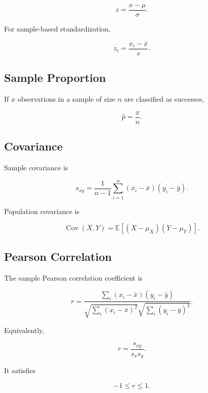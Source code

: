 \[
\boxed{
z
=
\frac{
x-\mu
}{
\sigma
}.
}
\]

For sample-based standardization,

\[
\boxed{
z_i
=
\frac{
x_i-\bar{x}
}{
s
}.
}
\]

\subsection{Sample Proportion}
\label{subsec:sample-proportion-reference}

If \(x\) observations in a sample of size \(n\) are classified as successes,

\[
\boxed{
\hat p
=
\frac{x}{n}.
}
\]

\subsection{Covariance}
\label{subsec:sample-covariance-reference}

Sample covariance is

\[
\boxed{
s_{xy}
=
\frac{
1
}{
n-1
}
\sum_{i=1}^{n}
(x_i-\bar{x})
(y_i-\bar{y}).
}
\]

Population covariance is

\[
\boxed{
\operatorname{Cov}(X,Y)
=
\mathbb{E}
[
(X-\mu_X)(Y-\mu_Y)
].
}
\]

\subsection{Pearson Correlation}
\label{subsec:pearson-correlation-reference}

The sample Pearson correlation coefficient is

\[
\boxed{
r
=
\frac{
\sum_i
(x_i-\bar{x})
(y_i-\bar{y})
}{
\sqrt{
\sum_i
(x_i-\bar{x})^2
}
\sqrt{
\sum_i
(y_i-\bar{y})^2
}
}.
}
\]

Equivalently,

\[
\boxed{
r
=
\frac{
s_{xy}
}{
s_xs_y
}.
}
\]

It satisfies

\[
\boxed{
-1\leq r\leq1.
}
\]

